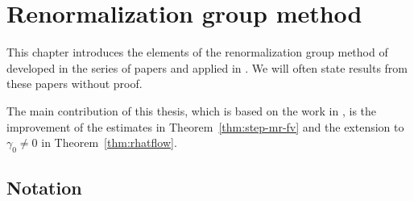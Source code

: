 \chapter{Renormalization group method}
\label{sec:rg}

\setcounter{footnote}{0}

\renewcommand{\pm}{+}					%

This chapter introduces the elements of the renormalization group method of
developed in the series of papers
\cite{BS-rg-norm,BS-rg-loc,BBS-rg-pt,BS-rg-IE,BS-rg-step} and
applied in \cite{BBS-phi4-log,BBS-saw4-log,BBS-saw4,ST-phi4}. We will often
state results from these papers without proof.

The main contribution of this
thesis, which is based on the work in \cite{BSTW-clp,BSW-saw-sa}, is the
improvement of the estimates in Theorem~\ref{thm:step-mr-fv} and the extension
to $\gamma_0 \ne 0$ in Theorem~\ref{thm:rhatflow}.



\section{Notation}

